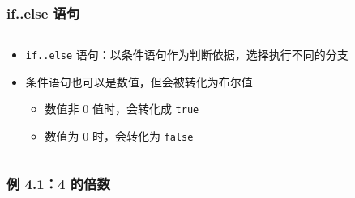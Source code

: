 \begin{frame}[fragile]
    \frametitle{if..else 语句}

    \begin{columns}
        \begin{overlayarea}{\textwidth}{.55\textheight}
            \begin{itemize}
                \item \lstinline|if..else| 语句：以条件语句作为判断依据，选择执行不同的分支

                \item 条件语句也可以是数值，但会被转化为布尔值

                    \begin{itemize}
                        \item<2-> 数值非 $0$ 值时，会转化成 \lstinline|true|
                        \item<3-> 数值为 $0$ 时，会转化为 \lstinline|false|
                    \end{itemize}

            \end{itemize}
        \end{overlayarea}

        \begin{overlayarea}{\textwidth}{.3\textheight}
            
        \end{overlayarea}
    \end{columns}
\end{frame}

\begin{frame}[fragile]
    \frametitle{例 4.1：4 的倍数}

\end{frame}

